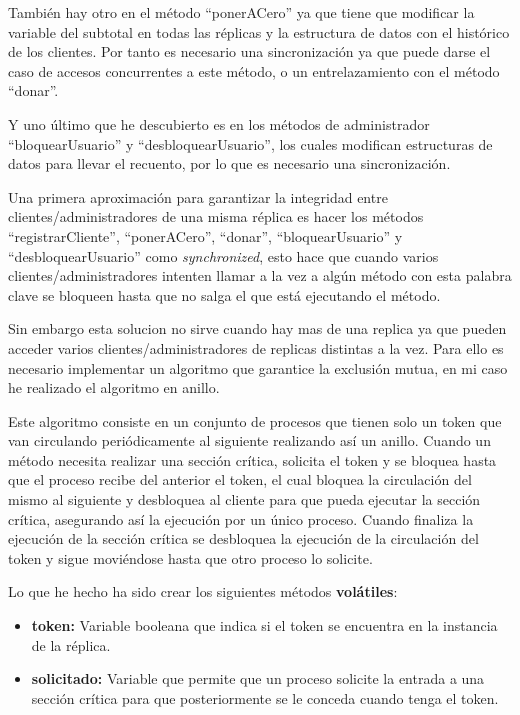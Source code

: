 \documentclass{article}
\begin{document}
También hay otro en el método ``ponerACero'' ya que tiene que modificar la variable del subtotal en todas las réplicas y la estructura de datos con el histórico de los clientes. Por tanto es necesario una sincronización ya que puede darse el caso de accesos concurrentes a este método, o un entrelazamiento con el método ``donar''.

Y uno último que he descubierto es en los métodos de administrador ``bloquearUsuario'' y ``desbloquearUsuario'', los cuales modifican estructuras de datos para llevar el recuento, por lo que es necesario una sincronización.

Una primera aproximación para garantizar la integridad entre clientes/administradores de una misma réplica es hacer los métodos ``registrarCliente'', ``ponerACero'', ``donar'', ``bloquearUsuario'' y ``desbloquearUsuario'' como \textit{synchronized}, esto hace que cuando varios clientes/administradores intenten llamar a la vez a algún método con esta palabra clave se bloqueen hasta que no salga el que está ejecutando el método.

Sin embargo esta solucion no sirve cuando hay mas de una replica ya que pueden acceder varios clientes/administradores de replicas distintas a la vez. Para ello es necesario implementar un algoritmo que garantice la exclusión mutua, en mi caso he realizado el algoritmo en anillo.

Este algoritmo consiste en un conjunto de procesos que tienen solo un token que van circulando periódicamente al siguiente realizando así un anillo. Cuando un método necesita realizar una sección crítica, solicita el token y se bloquea hasta que el proceso recibe del anterior el token, el cual bloquea la circulación del mismo al siguiente y desbloquea al cliente para que pueda ejecutar la sección crítica, asegurando así la ejecución por un único proceso. Cuando finaliza la ejecución de la sección crítica se desbloquea la ejecución de la circulación del token y sigue moviéndose hasta que otro proceso lo solicite.

Lo que he hecho ha sido crear los siguientes métodos \textbf{volátiles}:

\begin{itemize}
    \item \textbf{token: }Variable booleana que indica si el token se encuentra en la instancia de la réplica.
    \item \textbf{solicitado: }Variable que permite que un proceso solicite la entrada a una sección crítica para que posteriormente se le conceda cuando tenga el token.
\end{itemize}
\end{document}
